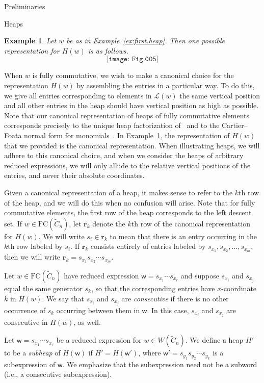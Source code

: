 \documentclass[12pt]{amsart}
\newtheorem{ex}[thm]{Example}
\newcommand{\C}{\widetilde{C}}
\renewcommand{\L}{\mathcal{L}}
\renewcommand{\(}{\left(}
\renewcommand{\)}{\right)}
\newcommand{\w}{\mathsf{w}}
\newcommand{\FC}{\mathrm{FC}}
\renewcommand{\r}{\mathbf{r}}
\begin{document}
\begin{section}{Preliminaries}
\begin{subsection}{Heaps}
\begin{ex}\label{second.heap.ex}
Let $w$ be as in Example~\ref{ex:first.heap}.  Then one possible representation for $H(w)$ is as follows.
\[
\texttt{[image: Fig.005]}
\]
\end{ex}

When $w$ is fully commutative, we wish to make a canonical choice for the representation $H(w)$ by assembling the entries in a particular way.  To do this, we give all entries corresponding to elements in $\L(w)$ the same vertical position and all other entries in the heap should have vertical position as high as possible.  Note that our canonical representation of heaps of fully commutative elements corresponds precisely to the unique heap factorization of~\cite[Lemma 2.9]{Viennot.G:A} and to the Cartier--Foata normal form for monomials~\cite{Cartier.P;Foata.D:A,Green.R:P}.  In Example~\ref{second.heap.ex}, the representation of $H(w)$ that we provided is the canonical representation.  When illustrating heaps, we will adhere to this canonical choice, and when we consider the heaps of arbitrary reduced expressions, we will only allude to the relative vertical positions of the entries, and never their absolute coordinates.  

Given a canonical representation of a heap, it makes sense to refer to the $k$th row of the heap, and we will do this when no confusion will arise.  Note that for fully commutative elements, the first row of the heap corresponds to the left descent set.  If $w \in \FC(\C_{n})$, let $\r_{k}$ denote the $k$th row of the canonical representation for $H(w)$.  We will write $s_{i} \in \r_{k}$ to mean that there is an entry occurring in the $k$th row labeled by $s_{i}$.  If $\r_{k}$ consists entirely of entries labeled by $s_{x_{1}}, s_{x_{2}}, \dots, s_{x_{m}}$, then we will write $\r_{k}=s_{x_{1}} s_{x_{2}} \cdots s_{x_{m}}$.  

Let $w \in \FC(\C_n)$ have reduced expression $\w=s_{x_1}\cdots s_{x_r}$ and suppose $s_{x_i}$ and $s_{x_j}$ equal the same generator $s_k$, so that the corresponding entries have $x$-coordinate $k$ in $H(w)$.  We say that $s_{x_i}$ and $s_{x_j}$ are \emph{consecutive} if there is no other occurrence of $s_{k}$ occurring between them in $\w$.  In this case, $s_{x_i}$ and $s_{x_j}$ are consecutive in $H(w)$, as well.  

Let $\w=s_{x_{1}} \cdots s_{x_{r}}$ be a reduced expression for $w \in W(\C_{n})$.  We define a heap $H'$ to be a \emph{subheap} of $H(\w)$ if $H'=H(\w')$, where $\w'=s_{y_1}s_{y_2} \cdots s_{y_k}$ is a subexpression of $\w$.  We emphasize that the subexpression need not be a subword (i.e., a consecutive subexpression).  


\end{subsection}
\end{section}
\end{document}
